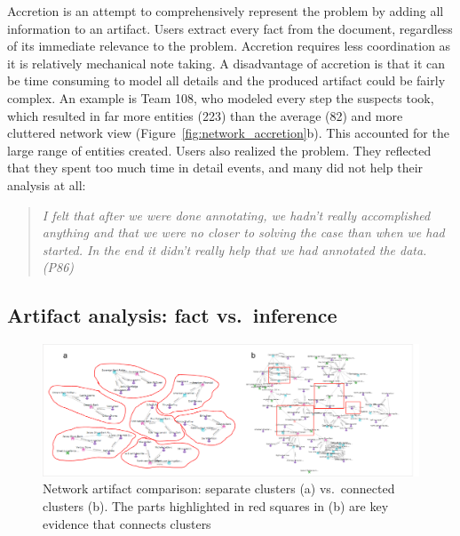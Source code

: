 Accretion is an attempt to comprehensively represent the problem by
adding all information to an artifact. Users extract every fact from the
document, regardless of its immediate relevance to the problem.
Accretion requires less coordination as it is relatively mechanical note
taking. A disadvantage of accretion is that it can be time consuming
to model all details and the produced artifact could be fairly complex.
An example is Team 108, who modeled
every step the suspects took, which resulted in far more entities (223) than
the average (82) and more cluttered network view (Figure~\ref{fig:network_accretion}b). This accounted for the large range of entities created. Users also realized the problem. They reflected that they spent too
much time in detail events, and many did not help their analysis at all:

\begin{quote}
\emph{I felt that after we were done annotating, we hadn't really accomplished
anything and that we were no closer to solving the case than when we had
started. In the end it didn't really help that we had annotated the
data. (P86)}
\end{quote}

\subsection{Artifact analysis: fact
vs.~inference}\label{artifact-construction-fact-vs.inference}

\begin{figure}
\centering
\includegraphics[width=\columnwidth]{img/network_cluster.png}
\caption{Network artifact comparison: separate clusters (a)
vs.~connected clusters (b). The parts highlighted in red squares in (b) are key
evidence that connects clusters\label{fig:network_cluster}}
\end{figure}

